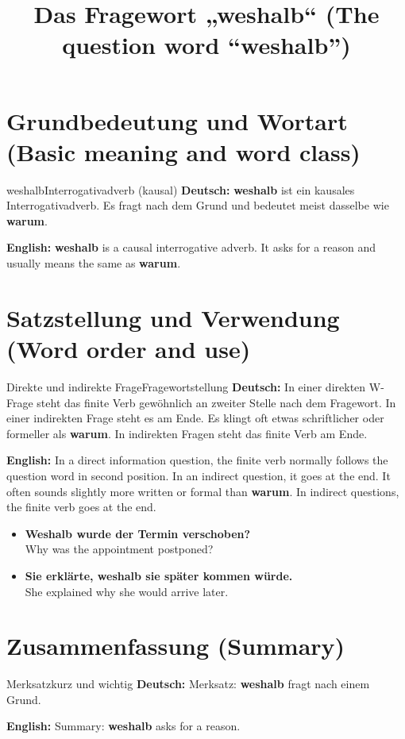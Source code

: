 \documentclass[a4paper,11pt]{article}
\title{Das Fragewort „weshalb“ (The question word “weshalb”)}
\date{}
\newcommand{\GermanText}[1]{\textbf{Deutsch: }#1\par}
\newcommand{\EnglishText}[1]{{\small\color{SoftGray}\textbf{English: }#1\par}}
\newcommand{\ExampleItem}[2]{\item \textbf{#1}\\{\small\color{SoftGray}#2}}
\begin{document}
\maketitle
\tableofcontents
\newpage
\section{Grundbedeutung und Wortart (Basic meaning and word class)}
\begin{grammarentry}{weshalb}{Interrogativadverb (kausal)}
\GermanText{\textbf{weshalb} ist ein kausales Interrogativadverb. Es fragt nach dem Grund und bedeutet meist dasselbe wie \textbf{warum}.}
\EnglishText{\textbf{weshalb} is a causal interrogative adverb. It asks for a reason and usually means the same as \textbf{warum}.}

\end{grammarentry}
\section{Satzstellung und Verwendung (Word order and use)}
\begin{grammarentry}{Direkte und indirekte Frage}{Fragewortstellung}
\GermanText{In einer direkten W-Frage steht das finite Verb gewöhnlich an zweiter Stelle nach dem Fragewort. In einer indirekten Frage steht es am Ende. Es klingt oft etwas schriftlicher oder formeller als \textbf{warum}. In indirekten Fragen steht das finite Verb am Ende.}
\EnglishText{In a direct information question, the finite verb normally follows the question word in second position. In an indirect question, it goes at the end. It often sounds slightly more written or formal than \textbf{warum}. In indirect questions, the finite verb goes at the end.}
\end{grammarentry}
\begin{exbox}\begin{itemize}
\ExampleItem{Weshalb wurde der Termin verschoben?}{Why was the appointment postponed?}
\ExampleItem{Sie erklärte, weshalb sie später kommen würde.}{She explained why she would arrive later.}
\end{itemize}\end{exbox}
\section{Zusammenfassung (Summary)}
\begin{grammarentry}{Merksatz}{kurz und wichtig}
\GermanText{Merksatz: \textbf{weshalb} fragt nach einem Grund.}
\EnglishText{Summary: \textbf{weshalb} asks for a reason.}
\end{grammarentry}
\end{document}
